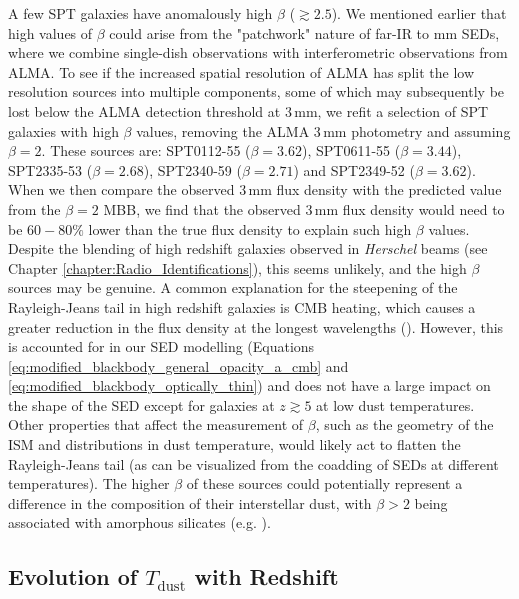 A few SPT galaxies have anomalously high $\beta$ ($\gtrsim 2.5$). We mentioned earlier that high values of $\beta$ could arise from the "patchwork" nature of far-IR to mm SEDs, where we combine single-dish observations with interferometric observations from ALMA. To see if the increased spatial resolution of ALMA has split the low resolution sources into multiple components, some of which may subsequently be lost below the ALMA detection threshold at $3\,$mm, we refit a selection of SPT galaxies with high $\beta$ values, removing the ALMA $3\,$mm photometry and assuming $\beta = 2$. These sources are: SPT0112-55 ($\beta = 3.62$), SPT0611-55 ($\beta = 3.44$), SPT2335-53 ($\beta = 2.68$), SPT2340-59 ($\beta = 2.71$) and SPT2349-52 ($\beta = 3.62$). When we then compare the observed $3\,$mm flux density with the predicted value from the $\beta = 2$ MBB, we find that the observed $3\,$mm flux density would need to be $60 - 80\%$ lower than the true flux density to explain such high $\beta$ values. Despite the blending of high redshift galaxies observed in \textit{Herschel} beams (see Chapter \ref{chapter:Radio_Identifications}), this seems unlikely, and the high $\beta$ sources may be genuine. A common explanation for the steepening of the Rayleigh-Jeans tail in high redshift galaxies is CMB heating, which causes a greater reduction in the flux density at the longest wavelengths (\citealt{daCunha_2013}). However, this is accounted for in our SED modelling (Equations \ref{eq:modified_blackbody_general_opacity_a_cmb} and \ref{eq:modified_blackbody_optically_thin}) and does not have a large impact on the shape of the SED except for galaxies at $z \gtrsim 5$ at low dust temperatures. Other properties that affect the measurement of $\beta$, such as the geometry of the ISM and distributions in dust temperature, would likely act to flatten the Rayleigh-Jeans tail (as can be visualized from the coadding of SEDs at different temperatures). The higher $\beta$ of these sources could potentially represent a difference in the composition of their interstellar dust, with $\beta > 2$ being associated with amorphous silicates (e.g. \citealt{Draine_1984, Agladze_1996, Meny_2007}).

\subsection{Evolution of $T_{\textrm{dust}}$ with Redshift}
\label{sec:dust_temperature_evolution}

